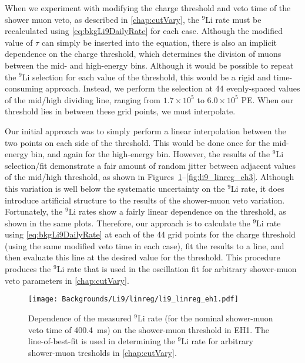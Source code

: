 \documentclass[../thesis.tex]{subfiles}
\begin{document}
When we experiment with modifying the charge threshold and veto time of the shower muon veto, as described in \autoref{chap:cutVary}, the $^9$Li rate must be recalculated using \autoref{eq:bkgLi9DailyRate} for each case. Although the modified value of $\tau$ can simply be inserted into the equation, there is also an implicit dependence on the charge threshold, which determines the division of muons between the mid- and high-energy bins. Although it would be possible to repeat the $^9$Li selection for each value of the threshold, this would be a rigid and time-consuming approach. Instead, we perform the selection at 44 evenly-spaced values of the mid/high dividing line, ranging from $1.7\times10^5$ to $6.0\times10^5$ PE\@. When our threshold lies in between these grid points, we must interpolate.

Our initial approach was to simply perform a linear interpolation between the two points on each side of the threshold. This would be done once for the mid-energy bin, and again for the high-energy bin. However, the results of the $^9$Li selection/fit demonstrate a fair amount of random jitter between adjacent values of the mid/high threshold, as shown in Figures~\ref{fig:li9_linreg_eh1}--\ref{fig:li9_linreg_eh3}. Although this variation is well below the systematic uncertainty on the $^9$Li rate, it does introduce artificial structure to the results of the shower-muon veto variation. Fortunately, the $^9$Li rates show a fairly linear dependence on the threshold, as shown in the same plots. Therefore, our approach is to calculate the $^9$Li rate using \autoref{eq:bkgLi9DailyRate} at each of the 44 grid points for the charge threshold (using the same modified veto time in each case), fit the results to a line, and then evaluate this line at the desired value for the threshold.
This procedure produces the $^9$Li rate that is used in the oscillation fit for arbitrary shower-muon veto parameters in \autoref{chap:cutVary}.

\begin{figure}[ht]
  \texttt{[image: Backgrounds/Li9/linreg/li9\_linreg\_eh1.pdf]}
  \caption{Dependence of the measured $^9$Li rate (for the nominal shower-muon veto time of 400.4~ms) on the shower-muon threshold in EH1. The line-of-best-fit is used in determining the $^9$Li rate for arbitrary shower-muon tresholds in \autoref{chap:cutVary}.}
  \label{fig:li9_linreg_eh1}
\end{figure}
\end{document}
